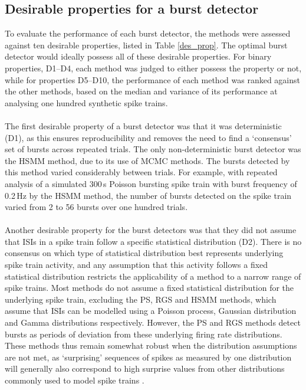 \documentclass[12pt, titlepage]{article}
\begin{document}
	\subsection*{Desirable properties for a burst detector}
	To evaluate the performance of each burst detector, the methods were assessed against ten desirable properties, listed in Table \ref{des_prop}. The optimal burst detector would ideally possess all of these desirable properties. For binary properties, D1--D4, each method was judged to either possess the property or not, while for properties D5--D10, the performance of each method was ranked against the other methods, based on the median and variance of its performance at analysing one hundred synthetic spike trains. 
	\\ \\ The first desirable property of a burst detector was that it was deterministic (D1), as this ensures reproducibility and removes the need to find a `consensus' set of bursts across repeated trials. The only non-deterministic burst detector was the HSMM method, due to its use of MCMC methods. The bursts detected by this method varied considerably between trials. For example, with repeated analysis of a simulated $300\,$s Poisson bursting spike train with burst frequency of 0.2$\,$Hz by the HSMM method, the number of bursts detected on the spike train varied from 2 to 56 bursts over one hundred trials. 
	\\ \\ Another desirable property for the burst detectors was that they did not assume that ISIs in a spike train follow a specific statistical distribution (D2). There is no consensus on which type of statistical distribution best represents underlying spike train activity, and any assumption that this activity follows a fixed statistical distribution restricts the applicability of a method to a narrow range of spike trains. Most methods do not assume a fixed statistical distribution for the underlying spike train, excluding the PS, RGS and HSMM methods, which assume that ISIs can be modelled using a Poisson process, Gaussian distribution and Gamma distributions respectively. However, the PS and RGS methods detect bursts as periods of deviation from these underlying firing rate distributions.
	These methods thus remain somewhat robust when the distribution assumptions are not met, as `surprising' sequences of spikes as measured by one distribution will generally also correspond to high surprise values from other distributions commonly used to model spike trains \cite{Legendy1985}. 
\end{document}
